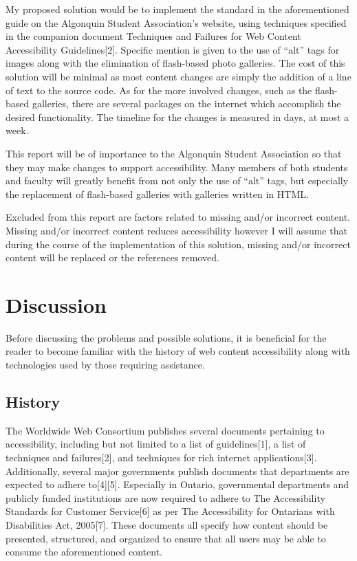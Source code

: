 \documentclass[]{article}
\begin{document}
My proposed solution would be to implement the standard in the
aforementioned guide on the Algonquin Student Association's website,
using techniques specified in the companion document Techniques and
Failures for Web Content Accessibility Guidelines{[}2{]}. Specific
mention is given to the use of ``alt'' tags for images along with the
elimination of flash-based photo galleries. The cost of this solution
will be minimal as most content changes are simply the addition of a
line of text to the source code. As for the more involved changes, such
as the flash-based galleries, there are several packages on the internet
which accomplish the desired functionality. The timeline for the changes
is measured in days, at most a week.

This report will be of importance to the Algonquin Student Association
so that they may make changes to support accessibility. Many members of
both students and faculty will greatly benefit from not only the use of
``alt'' tags, but especially the replacement of flash-based galleries
with galleries written in HTML.

Excluded from this report are factors related to missing and/or
incorrect content. Missing and/or incorrect content reduces
accessibility however I will assume that during the course of the
implementation of this solution, missing and/or incorrect content will
be replaced or the references removed.

\clearpage

\section{Discussion}\label{discussion}

Before discussing the problems and possible solutions, it is beneficial
for the reader to become familiar with the history of web content
accessibility along with technologies used by those requiring
assistance.

\subsection{History}\label{history}

The Worldwide Web Consortium publishes several documents pertaining to
accessibility, including but not limited to a list of guidelines{[}1{]},
a list of techniques and failures{[}2{]}, and techniques for rich
internet applications{[}3{]}. Additionally, several major governments
publish documents that departments are expected to adhere
to{[}4{]}{[}5{]}. Especially in Ontario, governmental departments and
publicly funded institutions are now required to adhere to The
Accessibility Standards for Customer Service{[}6{]} as per The
Accessibility for Ontarians with Disabilities Act, 2005{[}7{]}. These
documents all specify how content should be presented, structured, and
organized to ensure that all users may be able to consume the
aforementioned content.
\end{document}
